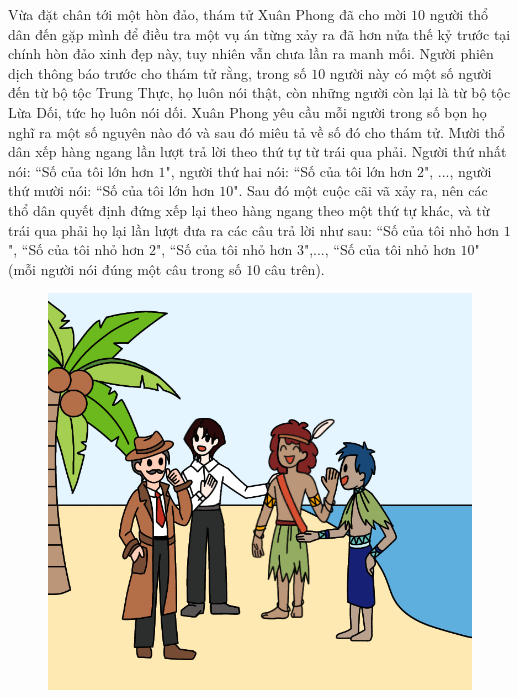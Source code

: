 \begin{multicols}{2}
	Vừa đặt chân tới một hòn đảo, thám tử Xuân Phong đã cho mời $10$ người thổ dân đến gặp mình để điều tra một vụ án từng xảy ra đã hơn nửa thế kỷ trước tại chính hòn đảo xinh đẹp này, tuy nhiên vẫn chưa lần ra manh mối. Người phiên dịch thông báo trước cho thám tử rằng, trong số $10$ người này có một số người đến từ bộ tộc Trung Thực, họ luôn nói thật, còn những người còn lại là từ bộ tộc Lừa Dối, tức họ luôn nói dối. Xuân Phong yêu cầu mỗi người trong số bọn họ nghĩ ra một số nguyên nào đó và sau đó miêu tả về số đó cho thám tử. Mười thổ dân xếp hàng ngang lần lượt trả lời theo thứ tự từ trái qua phải. Người thứ nhất nói: ``Số của tôi lớn hơn $1$", người thứ hai nói: ``Số của tôi lớn hơn $2$", ..., người thứ mười nói: ``Số của tôi lớn hơn $10$". Sau đó một cuộc cãi vã xảy ra, nên các thổ dân quyết định đứng xếp lại theo hàng ngang theo một thứ tự khác, và từ trái qua phải họ lại lần lượt đưa ra các câu trả lời như sau: ``Số của tôi nhỏ hơn $1$", ``Số của tôi nhỏ hơn $2$", ``Số của tôi nhỏ hơn $3$",..., ``Số của tôi nhỏ hơn $10$" (mỗi người nói đúng một câu trong số $10$ câu trên).
	\begin{figure}[H]
		\centering
		\vspace*{-5pt}
		\captionsetup{labelformat= empty, justification=centering}
		\includegraphics[width=1\linewidth]{xuanphong}
		\vspace*{-15pt}
	\end{figure}

\end{multicols}
